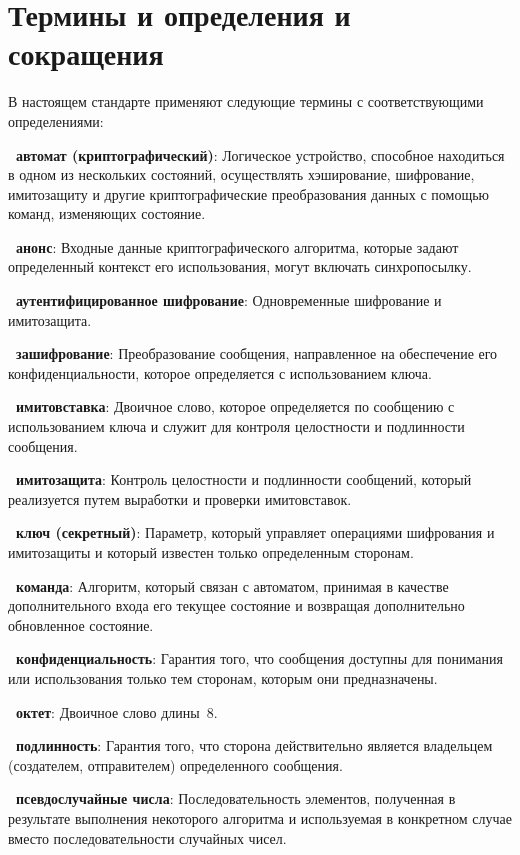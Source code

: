 \chapter{Термины и определения и сокращения}

В настоящем стандарте применяют
следующие термины с соответствующими определениями:

{\bf \thedefctr~автомат (криптографический)}:
Логическое устройство, способное находиться в одном из нескольких 
состояний, осуществлять хэширование, шифрование, имитозащиту и другие 
криптографические преобразования данных с помощью команд, изменяющих 
состояние.

{\bf \thedefctr~анонс}:
Входные данные криптографического алгоритма,
которые задают определенный контекст его использования,
могут включать синхропосылку.

{\bf \thedefctr~аутентифицированное шифрование}:
Одновременные шифрование и имитозащита.

{\bf \thedefctr~зашифрование}:
Преобразование сообщения,
направленное на обеспечение его конфиденциальности,
которое определяется с использованием ключа.

{\bf \thedefctr~имитовставка}:
Двоичное слово, 
которое определяется по сообщению с использованием ключа 
и служит для контроля целостности и подлинности сообщения.

{\bf \thedefctr~имитозащита}:
Контроль целостности и подлинности сообщений, 
который реализуется путем выработки и проверки имитовставок.

{\bf \thedefctr~ключ (секретный)}:
Параметр, который управляет операциями шифрования 
и имитозащиты и который известен только определенным сторонам.

{\bf \thedefctr~команда}:
Алгоритм, который связан с автоматом, принимая 
в качестве дополнительного входа его текущее состояние
и возвращая дополнительно обновленное состояние.

{\bf \thedefctr~конфиденциальность}:
Гарантия того, что сообщения доступны для понимания или использования
только тем сторонам, которым они предназначены.

{\bf \thedefctr~октет}:
Двоичное слово длины~$8$.

{\bf \thedefctr~подлинность}:
Гарантия того, что сторона действительно является
владельцем (создателем, отправителем) определенного сообщения.

{\bf \thedefctr~псевдослучайные числа}: 
Последовательность элементов, полученная в результате выполнения некоторого
алгоритма и используемая в конкретном случае вместо последовательности случайных
чисел.

